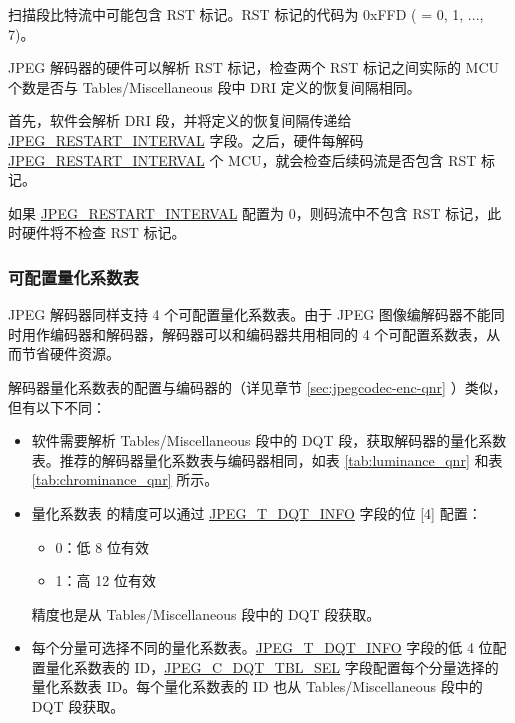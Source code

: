 \documentclass[main\_\_CN.tex]{subfiles}
\begin{document}
扫描段比特流中可能包含 RST 标记。RST 标记的代码为 0xFFD ( = 0, 1, ..., 7)。

JPEG 解码器的硬件可以解析 RST 标记，检查两个 RST 标记之间实际的 MCU 个数是否与 Tables/Miscellaneous 段中 DRI 定义的恢复间隔相同。

首先，软件会解析 DRI 段，并将定义的恢复间隔传递给 \hyperref[fielddesc:JPEGRESTARTINTERVAL]{JPEG\_RESTART\_INTERVAL} 字段。之后，硬件每解码 \hyperref[fielddesc:JPEGRESTARTINTERVAL]{JPEG\_RESTART\_INTERVAL} 个 MCU，就会检查后续码流是否包含 RST 标记。

如果 \hyperref[fielddesc:JPEGRESTARTINTERVAL]{JPEG\_RESTART\_INTERVAL} 配置为 0，则码流中不包含 RST 标记，此时硬件将不检查 RST 标记。

\subsubsection{可配置量化系数表}
\label{sec:jpegcodec-dec-qnr}

\chipname{} JPEG 解码器同样支持 4 个可配置量化系数表。由于 JPEG 图像编解码器不能同时用作编码器和解码器，解码器可以和编码器共用相同的 4 个可配置系数表，从而节省硬件资源。

解码器量化系数表的配置与编码器的（详见章节 \ref{sec:jpegcodec-enc-qnr} \textit{}）类似，但有以下不同：
\begin{itemize}
    \item 软件需要解析 Tables/Miscellaneous 段中的 DQT 段，获取解码器的量化系数表。推荐的解码器量化系数表与编码器相同，如表 \ref{tab:luminance_qnr} \textit{} 和表 \ref{tab:chrominance_qnr} \textit{} 所示。
    \item 量化系数表  的精度可以通过 \hyperref[regdesc:JPEGDQTINFOREG]{JPEG\_T\_DQT\_INFO} 字段的位 [4] 配置：
    \begin{itemize}
        \item 0：低 8 位有效
        \item 1：高 12 位有效
    \end{itemize}
    精度也是从 Tables/Miscellaneous 段中的 DQT 段获取。
    \item 每个分量可选择不同的量化系数表。\hyperref[regdesc:JPEGDQTINFOREG]{JPEG\_T\_DQT\_INFO} 字段的低 4 位配置量化系数表的 ID，\hyperref[fielddesc:JPEGC0DQTTBLSEL]{JPEG\_C\_DQT\_TBL\_SEL} 字段配置每个分量选择的量化系数表 ID。每个量化系数表的 ID 也从 Tables/Miscellaneous 段中的 DQT 段获取。
\end{itemize}
\end{document}
